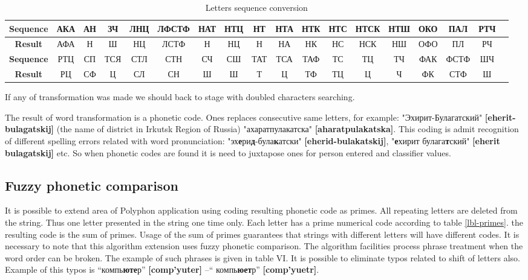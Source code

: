 \documentclass[conference,a4paper]{IEEEtran}
\begin{document}
\begin{table*}[t!]
	\caption{Letters sequence conversion}
    \label{lbl-seqconv}
    \centering
    \begin{tabular}{|c*{17}{|c}|}
    \hline
    \textbf{Sequence} &	АКА & АН &	ЗЧ &	ЛНЦ &	ЛФСТФ &	НАТ &	НТЦ &	НТ & НТА &	НТК &	НТС &	НТСК &	НТШ &	ОКО &	ПАЛ &	РТЧ \\
    \hline
	\textbf{Result} &	АФА &	Н &	Ш &	НЦ &	ЛСТФ &	Н &	НЦ & Н & НА &	НК  &	НС &	НСК &	НШ &	ОФО &	ПЛ &	РЧ \\
    \hline
	\addlinespace
    \hline
    \textbf{Sequence} &	РТЦ &	СП &	ТСЯ &	СТЛ &	СТН &	СЧ &	СШ &	ТАТ & ТСА &	ТАФ &	ТС &	ТЦ &	ТЧ &	ФАК &	ФСТФ &	ШЧ \\
    \hline
	\textbf{Result} &	РЦ &	СФ &	Ц &	СЛ &	СН &	Ш &	Ш &	Т & Ц &	ТФ &	ТЦ &	Ц &	Ч &	ФК &	СТФ &	Ш \\
    \hline
    \end{tabular}
\end{table*}

If any of transformation was made we should back to stage with doubled characters searching.

The result of word transformation is a phonetic code. Ones replaces consecutive same letters, for example: "Эхирит-Булагатский" \textbf{[eherit-bulagatskij]} (the name of district in Irkutsk Region of Russia) \rightarrow "ахаратпулакатска" \textbf{[aharatpulakatska]}. This coding is admit recognition of different spelling errors related with word pronunciation: "эх\textbf{е}ри\textbf{д}-була\textbf{к}атски" \textbf{[eherid-bulakatskij]}, "\textbf{е}хирит булага\textbf{т}ский" \textbf{[eherit bulagatskij]} etc. So when phonetic codes are found it is need to juxtapose ones for person entered and classifier values.


\subsection{Fuzzy phonetic comparison}

It is possible to extend area of Polyphon application using coding resulting phonetic code as primes. All repeating letters are deleted from the string. Thus one letter presented in the string one time only. Each letter has a prime numerical code according to table \ref{lbl-primes}. the resulting code is the sum of primes. Usage of the sum of primes guarantees that strings with different letters will have different codes. It is necessary to note that this algorithm extension uses fuzzy phonetic comparison. The algorithm facilities process phrase treatment when the word order can be broken. The example of such phrases is given in table VI. It is possible to eliminate typos related to shift of letters also. Example of this typos is “компь\textbf{юте}р” \textbf{[comp’yuter]} –“ компь\textbf{юет}р” \textbf{[comp’yuetr]}.
\end{document}
